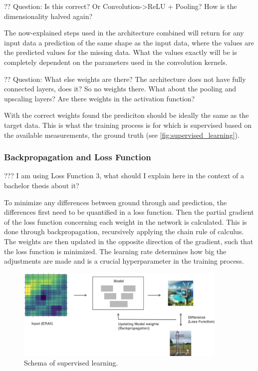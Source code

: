 ?? Question: Is this correct? Or Convolution->ReLU + Pooling? How is the dimensionality halved again?

The now-explained steps used in the architecture combined will return for any input data a prediction of the same shape as the input data, where the values are the predicted values for the missing data. What the values exactly will be is completely dependent on the parameters used in the convolution kernels.


?? Question: What else weights are there? The architecture does not have fully connected layers, does it? So no weights there. What about the pooling and upscaling layers? Are there weights in the activation function?

With the correct weights found the prediciton should be ideally the same as the target data. This is what the training process is for which is supervised based on the available measurements, the ground truth (see \autoref{fig:supervised_learning}). 

\subsubsection*{Backpropagation and Loss Function}

??? I am using Loss Function 3, what should I explain here in the context of a bachelor thesis about it?

To minimize any differences between ground through and prediction, the differences first need to be quantified in a loss function. Then the partial gradient of the loss function concerning each weight in the network is calculated. This is done through backpropagation, recursively applying the chain rule of calculus. The weights are then updated in the opposite direction of the gradient, such that the loss function is minimized. The learning rate determines how big the adjustments are made and is a crucial hyperparameter in the training process. 


\begin{figure}
    \centering
    \includegraphics[width=0.9\textwidth]{resources/images/supervised_learning.png}
    \caption{Schema of supervised learning.}
    \label{fig:supervised_learning}
\end{figure}


